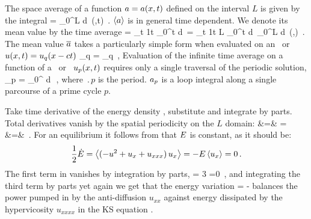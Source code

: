 %
The {space average} of a function $a = a(x,t)$ defined on
the interval $L$ is given by the integral
\beq
	\expct{\obser} = \int_0^{L} d\pSpace\, \obser(\pSpace,t)
	\,.
	\label{rpo:spac_ave}
\eeq
$\left\langle {a} \right\rangle$ is in general time dependent. We denote
its mean value by the {time average} 
\beq
\timeAver{\obser}
	= 
\lim_{t\rightarrow \infty} {1\over t} \int_0^t \! d\tau \, \expct{\obser}
	=
\lim_{t\rightarrow \infty} {1\over t L} \int_0^t \!d\tau \,
	\int_0^{L} \! d\pSpace\, \obser(\pSpace,\tau) 
	\,.
\label{rpo:tim_ave}
\eeq
The mean value
$\overline{a}$ takes a particularly simple form when
evaluated on an
\eqv\ or {\reqv} $u(x,t) = u_q(x-ct)$
\beq
         \obser_q = \expct{\obser}_q
\,,
\label{rpo:u-eqv}
\eeq
Evaluation of the infinite time average 
on a function of a \po\ or \rpo\ $u_p(x,t)$ 
 requires only a single traversal of the periodic solution,
\beq
       \obser_p =  
	\int_0^{} \! d\tau \, \expct{\obser}
\,,
\label{rpo:u-cyc}
\eeq
where $\period{p}$ is the period.
$a_p$ is a loop integral 
along a single parcourse of a prime cycle $p$.

Take time derivative of the energy density ,
substitute  and integrate by parts. Total derivatives vanish
by the spatial periodicity on the $L$ domain:
\bea
   \dot{\expctE} &=&
	 = 
	\continue
	&=&
    \,.
\label{rpo:ksErate}
\eea
For an equilibrium it follows from 
that $E$ is constant, as it should be:
\[
   \frac{1}{2}\dot{E} = 
\left\langle { (-u^2 + u_{x} + u_{xxx}) \,u_x} \right\rangle
	= - E \left\langle { u_x } \right\rangle=0
    \,.
\]
The first term in  vanishes by
integration by parts,
\beq
  = 3 =0
\,,
and integrating the third term by parts yet again we get
that the energy variation
\beq
   \dot{\expctE} = 
	   - 
balances the power pumped in by the anti-diffusion
$u_{xx}$ 
against energy dissipated by the hypervicosity $u_{xxxx}$
in the KS equation .

